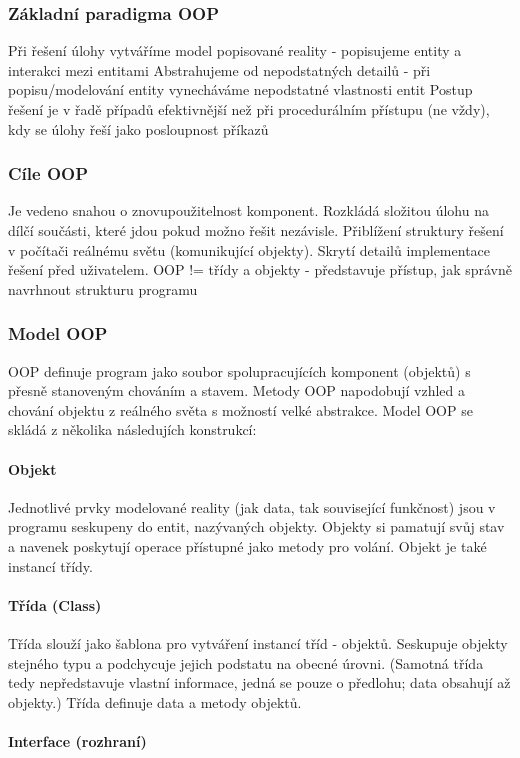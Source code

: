 \documentclass[10pt,a4paper]{article}
\begin{document}
\subsubsection{Základní paradigma OOP}
Při řešení úlohy vytváříme model popisované reality - popisujeme entity a interakci mezi entitami
Abstrahujeme od nepodstatných detailů - při popisu/modelování entity vynecháváme nepodstatné vlastnosti entit
Postup řešení je v řadě případů efektivnější než při procedurálním přístupu (ne vždy), kdy se úlohy řeší jako posloupnost příkazů 
\subsubsection{Cíle OOP}
Je vedeno snahou o znovupoužitelnost komponent.
Rozkládá složitou úlohu na dílčí součásti, které jdou pokud možno řešit nezávisle.
Přiblížení struktury řešení v počítači reálnému světu (komunikující objekty).
Skrytí detailů implementace řešení před uživatelem.
OOP != třídy a objekty - představuje přístup, jak správně navrhnout strukturu programu

\subsubsection{Model OOP}
OOP definuje program jako soubor spolupracujících komponent (objektů) s přesně stanoveným chováním a stavem. Metody OOP napodobují vzhled a chování objektu z reálného světa s možností velké abstrakce. Model OOP se skládá z několika následujích konstrukcí:
\paragraph{Objekt} 

Jednotlivé prvky modelované reality (jak data, tak související funkčnost) jsou v programu seskupeny do entit, nazývaných objekty. Objekty si pamatují svůj stav a navenek poskytují operace přístupné jako metody pro volání. Objekt je také instancí třídy.
\paragraph{Třída (Class)}

Třída slouží jako šablona pro vytváření instancí tříd - objektů. Seskupuje objekty stejného typu a podchycuje jejich podstatu na obecné úrovni.  (Samotná třída tedy nepředstavuje vlastní informace, jedná se pouze o předlohu; data obsahují až objekty.) Třída definuje data a metody objektů.
\paragraph{Interface (rozhraní)}
\end{document}

